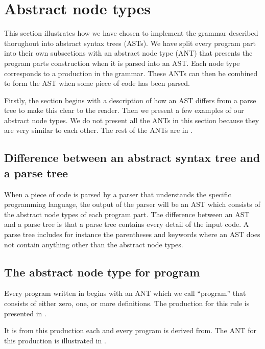 \section{Abstract node types}
\label{sec:ant}

This section illustrates how we have chosen to implement the grammar described
thorughout  into abstract syntax trees (ASTs). 
We have split every program part into their own subsections with an abstract
node type (ANT) that presents the program parts construction when it is parsed into an
AST. Each node type corresponds to a production in the grammar. These ANTs can
then be combined to form the AST when some piece of code has been parsed.

Firstly, the section begins with a description of how an AST differs from a parse tree 
to make this clear to the reader. Then we present a few examples of our abstract
node types. We do not present all the ANTs in this section because they are very
similar to each other. The rest of the ANTs are in .

\subsection{Difference between an abstract syntax tree and a parse tree}
When a piece of code is parsed by a parser that understands the specific programming 
language, the output of the parser will be an AST which consists of the abstract node 
types of each program part. The difference between an AST and a parse tree is that a 
parse tree contains every detail of the input code. A parse tree includes for instance
the parentheses and keywords where an AST does not contain anything other than the 
abstract node types.\cite{parsevsast}

\subsection{The abstract node type for program}
Every program written in \productname{} begins with an ANT which 
we call ``program'' that consists of either zero, one, or more definitions. The 
production for this rule is presented in .


It is from this production each and every program is derived from. The ANT for 
this production is illustrated in .

